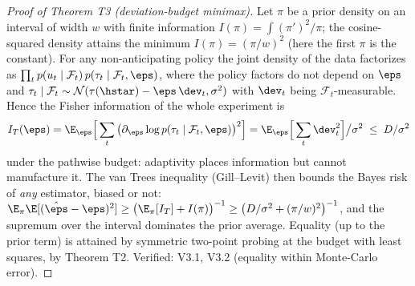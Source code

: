 \begin{proof}[Proof of Theorem T3 (deviation-budget minimax)]
Let $\pi$ be a prior density on an interval of width $w$ with finite
information $I(\pi) = \int (\pi')^2/\pi$; the cosine-squared density
attains the minimum $I(\pi) = (\pi/w)^2$ (here the first $\pi$ is the
constant). For any non-anticipating policy the joint density of the data
factorizes as
$\prod_t p(u_t \mid \mathcal{F}_t)\, p(\tau_t \mid \mathcal{F}_t, \eps)$,
where the policy factors do not depend on $\eps$ and
$\tau_t \mid \mathcal{F}_t \sim \mathcal{N}(\tau(\hstar) - \eps\,\dev_t,
\sigma^2)$ with $\dev_t$ being $\mathcal{F}_t$-measurable. Hence the Fisher
information of the whole experiment is
\[
I_T(\eps) = \E_\eps\Big[\sum_t \big(\partial_\eps \log
p(\tau_t \mid \mathcal{F}_t, \eps)\big)^2\Big]
 = \E_\eps\Big[\sum_t \dev_t^2\Big]\big/\sigma^2 \;\le\; D/\sigma^2
\]
under the pathwise budget: adaptivity places information but cannot
manufacture it. The van Trees inequality (Gill--Levit) then bounds the
Bayes risk of \emph{any} estimator, biased or not:
$\E_\pi \E[(\hat\eps - \eps)^2] \ge \big(\E_\pi[I_T] + I(\pi)\big)^{-1}
\ge \big(D/\sigma^2 + (\pi/w)^2\big)^{-1}$, and the supremum over the
interval dominates the prior average. Equality (up to the prior term) is
attained by symmetric two-point probing at the budget with least squares,
by Theorem T2. Verified: V3.1, V3.2 (equality within Monte-Carlo error).
\end{proof}

